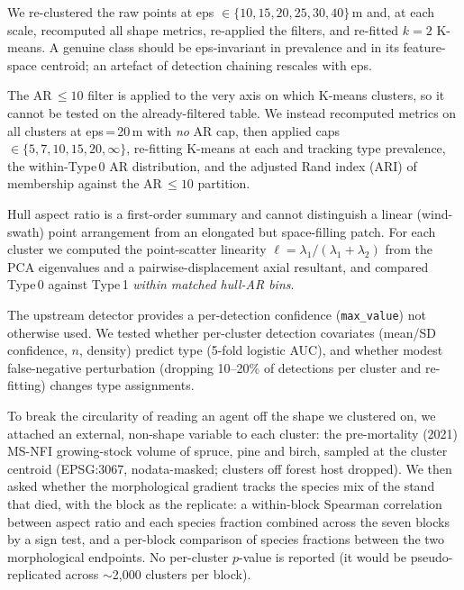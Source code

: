 \documentclass[twocolumn]{article}
\begin{document}
We re-clustered the raw points at eps $\in \{10,15,20,25,30,40\}$\,m and, at each scale, recomputed
all shape metrics, re-applied the filters, and re-fitted $k=2$ K-means. A genuine class should be
eps-invariant in prevalence and in its feature-space centroid; an artefact of detection chaining
rescales with eps.

The AR\,$\leq 10$ filter is applied to the very axis on which K-means clusters, so it cannot be
tested on the already-filtered table. We instead recomputed metrics on all clusters at eps\,=\,20\,m
with \emph{no} AR cap, then applied caps $\in \{5,7,10,15,20,\infty\}$, re-fitting K-means at each and
tracking type prevalence, the within-Type\,0 AR distribution, and the adjusted Rand index (ARI) of
membership against the AR\,$\leq 10$ partition.

Hull aspect ratio is a first-order summary and cannot distinguish a linear (wind-swath) point
arrangement from an elongated but space-filling patch. For each cluster we computed the point-scatter
linearity $\ell = \lambda_1/(\lambda_1+\lambda_2)$ from the PCA eigenvalues and a pairwise-displacement
axial resultant, and compared Type\,0 against Type\,1 \emph{within matched hull-AR bins}.

The upstream detector provides a per-detection confidence (\texttt{max\_value}) not otherwise used.
We tested whether per-cluster detection covariates (mean/SD confidence, $n$, density) predict type
(5-fold logistic AUC), and whether modest false-negative perturbation (dropping 10--20\% of detections
per cluster and re-fitting) changes type assignments.

To break the circularity of reading an agent off the shape we clustered on, we attached an external,
non-shape variable to each cluster: the pre-mortality (2021) MS-NFI growing-stock volume of spruce,
pine and birch, sampled at the cluster centroid (EPSG:3067, nodata-masked; clusters off forest host
dropped). We then asked whether the morphological gradient tracks the species mix of the stand that
died, with the block as the replicate: a within-block Spearman correlation between aspect ratio and
each species fraction combined across the seven blocks by a sign test, and a per-block comparison of
species fractions between the two morphological endpoints. No per-cluster $p$-value is reported (it
would be pseudo-replicated across $\sim$2{,}000 clusters per block).
\end{document}
